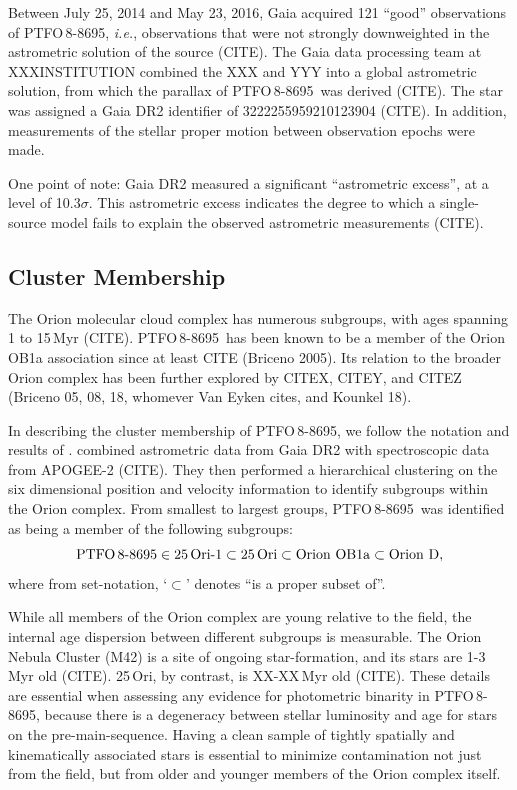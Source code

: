 \documentclass[12pt,twocolumn,tighten]{aastex62}
\newcommand{\ptfo}{PTFO$\,$8-8695}
\begin{document}
Between July 25, 2014 and May 23, 2016, Gaia acquired 121 ``good''
observations of \ptfo, {\it i.e.}, observations that were not strongly
downweighted in the astrometric solution of the source (CITE).
The Gaia data processing team at XXXINSTITUTION combined the XXX and
YYY into a global astrometric solution, from which the parallax of 
\ptfo\ was derived (CITE).
The star was assigned a Gaia DR2 identifier of 3222255959210123904
(CITE).
In addition, measurements of the stellar proper motion between
observation epochs were made.

One point of note:
Gaia DR2 measured a significant ``astrometric excess'', at a level of
10.3$\sigma$.
This astrometric excess indicates the degree
to which a single-source model fails to explain the observed astrometric
measurements (CITE).

\subsection{Cluster Membership}
The Orion molecular cloud complex has numerous subgroups, with ages
spanning 1 to 15$\,$Myr (CITE).
\ptfo\ has been known to be a member of the Orion OB1a association
since at least CITE (Briceno 2005).
Its relation to the broader Orion complex has been further explored by
CITEX, CITEY, and CITEZ (Briceno 05, 08, 18, whomever Van Eyken cites,
and Kounkel 18).

In describing the cluster membership of \ptfo, we follow the notation
and results of \citet{kounkel_apogee2_2018}.
\citet{kounkel_apogee2_2018} combined astrometric data from Gaia DR2
with spectroscopic data from APOGEE-2 (CITE).  They then performed a
hierarchical clustering on the six dimensional position and velocity
information to identify subgroups within the Orion complex.  From
smallest to largest groups, \ptfo\ was identified as being a member of
the following subgroups:
\begin{equation}
  {\rm PTFO\,8\text{-}8695}
  \in {\rm 25\,Ori\text{-}1}
  \subset {\rm 25\,Ori}
  \subset {\rm Orion\ OB1a}
  \subset {\rm Orion\ D},
\end{equation}
where from set-notation, `$\subset$' denotes ``is a proper subset of''.

While all members of the Orion complex are young relative to the
field, the internal age dispersion between different subgroups is
measurable.  The Orion Nebula Cluster (M42) is a site of ongoing
star-formation, and its stars are 1-3$\,$Myr old (CITE).
25$\,$Ori, by contrast, is XX-XX$\,$Myr old (CITE).  These details
are essential when assessing any evidence for photometric binarity in
\ptfo, because there is a degeneracy between stellar luminosity and
age for stars on the pre-main-sequence.  Having a clean sample of
tightly spatially and kinematically associated stars is essential to
minimize contamination not just from the field, but from older and
younger members of the Orion complex itself.
\end{document}
